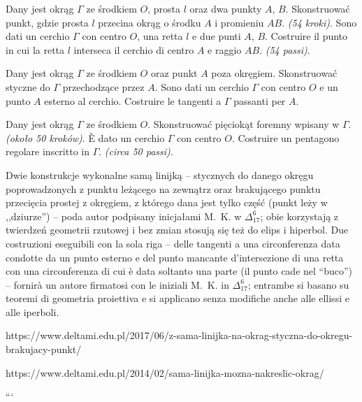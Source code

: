 \begin{problem}
    Dany jest okrąg $\Gamma$ ze środkiem $O$, prosta $l$ oraz dwa punkty $A$, $B$. %
    Skonstruować punkt, gdzie prosta $l$ przecina okrąg o środku $A$ i promieniu $AB$. %
    \hfill \emph{(54 kroki)}. %
    Sono dati un cerchio $\Gamma$ con centro $O$, una retta $l$ e due punti $A$, $B$. %
    Costruire il punto in cui la retta $l$ interseca il cerchio di centro $A$ e raggio $AB$. %
    \hfill \emph{(54 passi)}. %
\end{problem}

\begin{problem}
    Dany jest okrąg $\Gamma$ ze środkiem $O$ oraz punkt $A$ poza okręgiem. %
    Skonstruować styczne do $\Gamma$ przechodzące przez $A$. %
    Sono dati un cerchio $\Gamma$ con centro $O$ e un punto $A$ esterno al cerchio. %
    Costruire le tangenti a $\Gamma$ passanti per $A$. %
\end{problem}

\begin{problem}
    Dany jest okrąg $\Gamma$ ze środkiem $O$. %
    Skonstruować pięciokąt foremny wpisany w $\Gamma$. %
    \hfill \emph{(około 50 kroków)}. %
    È dato un cerchio $\Gamma$ con centro $O$. %
    Costruire un pentagono regolare inscritto in $\Gamma$. %
    \hfill \emph{(circa 50 passi)}. %
\end{problem}

Dwie konstrukcje wykonalne samą linijką -- stycznych do danego okręgu poprowadzonych z punktu leżącego na zewnątrz oraz brakującego punktu przecięcia prostej z okręgiem, z którego dana jest tylko część (punkt leży w ,,dziurze'') -- poda autor podpisany inicjałami M.~K. w $\Delta_{17}^{6}$; obie korzystają z twierdzeń geometrii rzutowej i bez zmian stosują się też do elips i hiperbol. %
Due costruzioni eseguibili con la sola riga -- delle tangenti a una circonferenza data condotte da un punto esterno e del punto mancante d'intersezione di una retta con una circonferenza di cui è data soltanto una parte (il punto cade nel ``buco'') -- fornirà un autore firmatosi con le iniziali M.~K. in $\Delta_{17}^{6}$; entrambe si basano su teoremi di geometria proiettiva e si applicano senza modifiche anche alle ellissi e alle iperboli. %

https://www.deltami.edu.pl/2017/06/z-sama-linijka-na-okrag-styczna-do-okregu-brakujacy-punkt/

https://www.deltami.edu.pl/2014/02/sama-linijka-mozna-nakreslic-okrag/

%
```
